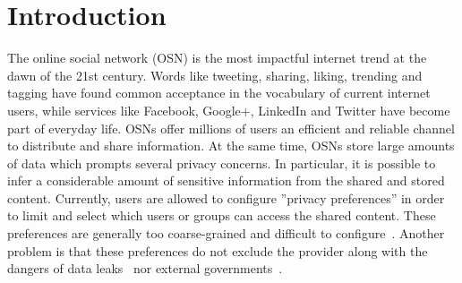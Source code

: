 \chapter{Introduction}
\label{cha:intro}
The online social network (OSN) is the most impactful internet trend at the dawn of the 21st century. Words like tweeting, sharing, liking, trending and tagging have found common acceptance in the vocabulary of current internet users, while services like Facebook, Google+, LinkedIn and Twitter have become part of everyday life. OSNs offer millions of users an efficient and reliable channel to distribute and share information. At the same time, OSNs store large amounts of data which prompts several privacy concerns. In particular, it is possible to infer a considerable amount of sensitive information from the shared and stored content. Currently, users are allowed to configure ''privacy preferences'' in order to limit and select which users or groups can access the shared content. These preferences are generally too coarse-grained and difficult to configure~\cite{bonneau2010privacy}. Another problem is that these preferences do not exclude the provider along with the dangers of data leaks~\cite{fischetti11hacker} nor external governments~\cite{prism}.




